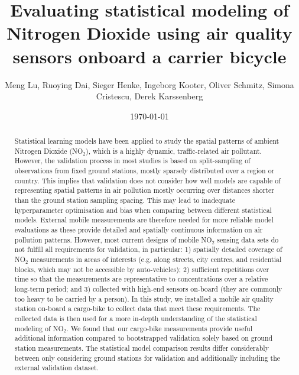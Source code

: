 \documentclass{article}
\title{Evaluating statistical modeling of Nitrogen Dioxide using air quality sensors onboard a carrier bicycle}
\author{Meng Lu,  Ruoying Dai, Sieger Henke,  Ingeborg Kooter, Oliver Schmitz, Simona Cristescu, Derek Karssenberg}
\date{\today}
\begin{document}
\maketitle

\begin{abstract}
Statistical learning models have been applied to study the spatial patterns of ambient Nitrogen Dioxide (NO$_2$), which is a highly dynamic, traffic-related air pollutant. However, the validation process in most studies is based on split-sampling of observations from fixed ground stations, mostly sparsely distributed over a region or country. This implies that validation does not consider how well models are capable of representing spatial patterns in air pollution mostly occurring over distances shorter than the ground station sampling spacing. This may lead to inadequate hyperparameter optimisation and bias when comparing between different statistical models. External mobile measurements are therefore needed for more reliable model evaluations as these provide detailed and spatially continuous information on air pollution patterns. However, most current designs of mobile NO$_2$ sensing data sets do not fulfill all requirements for validation, in particular: 1) spatially detailed coverage of NO$_2$ measurements in areas of interests (e.g. along streets, city centres, and residential blocks, which may not be accessible by auto-vehicles); 2) sufficient repetitions over time so that the measurements are representative to concentrations over a relative long-term period; and 3) collected with high-end sensors on-board (they are commonly too heavy to be carried by a person). In this study, we installed a mobile air quality station on-board  a cargo-bike to collect data that meet these requirements. The collected data is then used for a more in-depth understanding of the statistical modeling of NO$_2$. We found that our cargo-bike measurements provide useful additional information compared to bootstrapped validation solely based on ground station measurements. The statistical model comparison results differ considerably between only considering ground stations for validation and additionally including the external validation dataset. 

 
\end{abstract}
\end{document}
